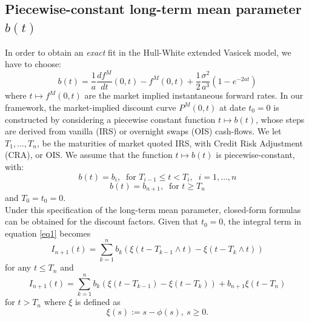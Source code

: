 \subsection{Piecewise-constant long-term mean parameter $b(t)$}
\label{calibr_bi}

In order to obtain an \textit{exact} fit in the Hull-White extended Vasicek model, we have to choose:
\begin{equation}
\label{b_equation}
b(t) = \frac{1}{a}\frac{df^M}{dt}(0, t) - f^M(0, t) + \frac{1}{2}\frac{\sigma^2}{a^3}\left( 1 - e^{-2at}\right)
\end{equation}
where $t \mapsto f^M(0, t)$ are the market implied instantaneous forward rates. In our framework, the market-implied discount curve $P^M(0,t)$ at  date $t_{0}=0$ is constructed by considering a piecewise constant function $t \mapsto b(t)$, whose steps are derived from vanilla (IRS) or overnight swaps (OIS) cash-flows.
We let $T_1, \ldots, T_n$, be the maturities of market quoted IRS, with Credit Risk Adjustment (CRA), or OIS. We assume that the function $t \mapsto b(t)$ is piecewise-constant, with:
\medskip
\begin{equation}
\label{bi}
b(t)= b_i,\;\; \mbox{for } T_{i-1} \le t < T_i,\;\;i=1,\ldots,n
\end{equation}
\begin{equation}
\label{b_inf}
b(t)= b_{n+1},\;\; \mbox{for } t \geq T_n
\end{equation}
\medskip
and $T_0 = t_0 = 0$.\\
Under this specification of the long-term mean parameter, closed-form formulas can be obtained for the discount factors. Given that $t_{0}=0$, the integral term  in equation \eqref{eq1} becomes 
\begin{equation}
\label{Intb}
I_{n+1}(t) = \sum_{k=1}^n b_k \left( \xi(t - T_{k-1} \wedge t) -  \xi(t - T_k \wedge t) \right)
\end{equation}
\medskip
for any $t \leq T_n$ and
\begin{equation}
\label{Intb}
I_{n+1}(t) = \sum_{k=1}^n b_k \left( \xi(t - T_{k-1}) -  \xi(t - T_k ) \right) + b_{n+1} \xi(t - T_n)
\end{equation}
for $t > T_n$ where $\xi$ is defined as
\begin{equation}
\xi(s) := s - \phi(s), \: s \geq 0.
\end{equation}
